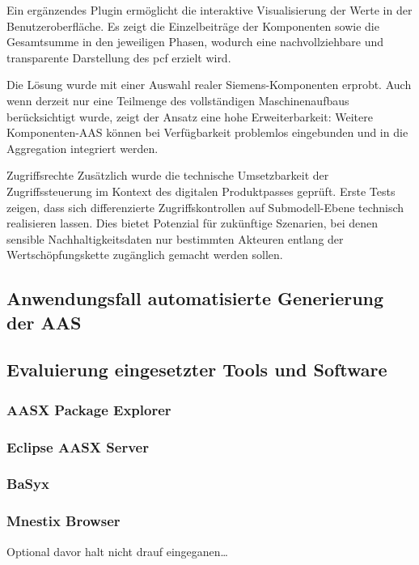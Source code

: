 Ein ergänzendes Plugin ermöglicht die interaktive Visualisierung der Werte in der Benutzeroberfläche. Es zeigt die Einzelbeiträge der Komponenten sowie die Gesamtsumme in den jeweiligen Phasen, wodurch eine nachvollziehbare und transparente Darstellung des \acs{pcf} erzielt wird.

Die Lösung wurde mit einer Auswahl realer Siemens-Komponenten erprobt. Auch wenn derzeit nur eine Teilmenge des vollständigen Maschinenaufbaus berücksichtigt wurde, zeigt der Ansatz eine hohe Erweiterbarkeit: Weitere Komponenten-AAS können bei Verfügbarkeit problemlos eingebunden und in die Aggregation integriert werden.

Zugriffsrechte
Zusätzlich wurde die technische Umsetzbarkeit der Zugriffssteuerung im Kontext des digitalen Produktpasses geprüft. Erste Tests zeigen, dass sich differenzierte Zugriffskontrollen auf Submodell-Ebene technisch realisieren lassen. Dies bietet Potenzial für zukünftige Szenarien, bei denen sensible Nachhaltigkeitsdaten nur bestimmten Akteuren entlang der Wertschöpfungskette zugänglich gemacht werden sollen.

\subsection{Anwendungsfall automatisierte Generierung der AAS}

\subsection{Evaluierung eingesetzter Tools und Software}
\subsubsection{AASX Package Explorer}
\subsubsection{Eclipse AASX Server}
\subsubsection{BaSyx}
\subsubsection{Mnestix Browser}
Optional davor halt nicht drauf eingeganen\dots